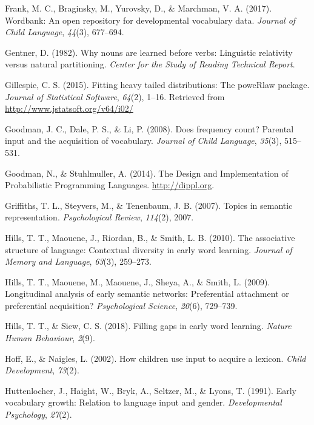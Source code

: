 \documentclass[english,,man,floatsintext]{apa6}
\begin{document}
\leavevmode\hypertarget{ref-frank2017}{}%
Frank, M. C., Braginsky, M., Yurovsky, D., \& Marchman, V. A. (2017). Wordbank: An open repository for developmental vocabulary data. \emph{Journal of Child Language}, \emph{44}(3), 677--694.

\leavevmode\hypertarget{ref-gentner1982}{}%
Gentner, D. (1982). Why nouns are learned before verbs: Linguistic relativity versus natural partitioning. \emph{Center for the Study of Reading Technical Report}.

\leavevmode\hypertarget{ref-gillespie15}{}%
Gillespie, C. S. (2015). Fitting heavy tailed distributions: The poweRlaw package. \emph{Journal of Statistical Software}, \emph{64}(2), 1--16. Retrieved from \url{http://www.jstatsoft.org/v64/i02/}

\leavevmode\hypertarget{ref-goodman2008}{}%
Goodman, J. C., Dale, P. S., \& Li, P. (2008). Does frequency count? Parental input and the acquisition of vocabulary. \emph{Journal of Child Language}, \emph{35}(3), 515--531.

\leavevmode\hypertarget{ref-dippl}{}%
Goodman, N., \& Stuhlmuller, A. (2014). The Design and Implementation of Probabilistic Programming Languages. \url{http://dippl.org}.

\leavevmode\hypertarget{ref-griffiths07}{}%
Griffiths, T. L., Steyvers, M., \& Tenenbaum, J. B. (2007). Topics in semantic representation. \emph{Psychological Review}, \emph{114}(2), 2007.

\leavevmode\hypertarget{ref-hills2010}{}%
Hills, T. T., Maouene, J., Riordan, B., \& Smith, L. B. (2010). The associative structure of language: Contextual diversity in early word learning. \emph{Journal of Memory and Language}, \emph{63}(3), 259--273.

\leavevmode\hypertarget{ref-hills2009}{}%
Hills, T. T., Maouene, M., Maouene, J., Sheya, A., \& Smith, L. (2009). Longitudinal analysis of early semantic networks: Preferential attachment or preferential acquisition? \emph{Psychological Science}, \emph{20}(6), 729--739.

\leavevmode\hypertarget{ref-hills2018}{}%
Hills, T. T., \& Siew, C. S. (2018). Filling gaps in early word learning. \emph{Nature Human Behaviour}, \emph{2}(9).

\leavevmode\hypertarget{ref-hoff2002}{}%
Hoff, E., \& Naigles, L. (2002). How children use input to acquire a lexicon. \emph{Child Development}, \emph{73}(2).

\leavevmode\hypertarget{ref-huttenlocher1991}{}%
Huttenlocher, J., Haight, W., Bryk, A., Seltzer, M., \& Lyons, T. (1991). Early vocabulary growth: Relation to language input and gender. \emph{Developmental Psychology}, \emph{27}(2).
\end{document}
